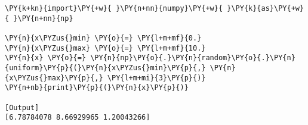 \begin{Verbatim}[label=\makebox{\href{https://github.com/unipi-physics-labs/statnotes/tree/main/snippy/np.random.uniform.py}{https://github.com/.../np.random.uniform.py}},commandchars=\\\{\}]
\PY{k+kn}{import}\PY{+w}{ }\PY{n+nn}{numpy}\PY{+w}{ }\PY{k}{as}\PY{+w}{ }\PY{n+nn}{np}

\PY{n}{x\PYZus{}min} \PY{o}{=} \PY{l+m+mf}{0.}
\PY{n}{x\PYZus{}max} \PY{o}{=} \PY{l+m+mf}{10.}
\PY{n}{x} \PY{o}{=} \PY{n}{np}\PY{o}{.}\PY{n}{random}\PY{o}{.}\PY{n}{uniform}\PY{p}{(}\PY{n}{x\PYZus{}min}\PY{p}{,} \PY{n}{x\PYZus{}max}\PY{p}{,} \PY{l+m+mi}{3}\PY{p}{)}
\PY{n+nb}{print}\PY{p}{(}\PY{n}{x}\PY{p}{)}

[Output]
[6.78784078 8.66929965 1.20043266]
\end{Verbatim}
